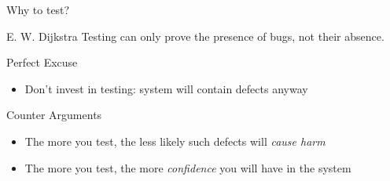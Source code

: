 \begin{frame}{Why to test?}
  \begin{boitequote}{E. W. Dijkstra}
    Testing can only prove the presence of bugs, not their absence.
  \end{boitequote}

  \bigskip
  \begin{block}{Perfect Excuse}
    \begin{itemize}
    \item Don't invest in testing: system will contain defects anyway
    \end{itemize}
  \end{block}

  \begin{block}{Counter Arguments}
    \begin{itemize}
    \item The more you test, the less likely such defects will \textit{cause
        harm}
    \item The more you test, the more \textit{confidence} you will have in the
      system
    \end{itemize}    
  \end{block}
\end{frame}
